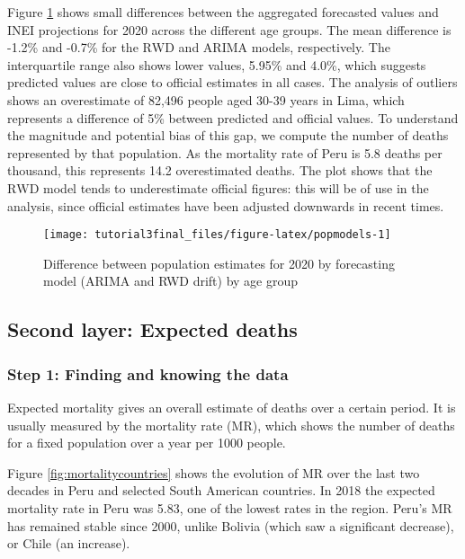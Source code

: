 \documentclass[
]{article}
\begin{document}
Figure \ref{fig:popmodels} shows small differences between the aggregated forecasted values and INEI projections for 2020 across the different age groups. The mean difference is -1.2\% and -0.7\% for the \(\text{RWD}\) and \(\text{ARIMA}\) models, respectively. The interquartile range also shows lower values, 5.95\% and 4.0\%, which suggests predicted values are close to official estimates in all cases. The analysis of outliers shows an overestimate of 82,496 people aged 30-39 years in Lima, which represents a difference of 5\% between predicted and official values. To understand the magnitude and potential bias of this gap, we compute the number of deaths represented by that population. As the mortality rate of Peru is 5.8 deaths per thousand, this represents 14.2 overestimated deaths. The plot shows that the \(\text{RWD}\) model tends to underestimate official figures: this will be of use in the analysis, since official estimates have been adjusted downwards in recent times.

\begin{figure}[H]

{\centering \texttt{[image: tutorial3final\_files/figure-latex/popmodels-1]} 

}

\caption{Difference between population estimates for 2020 by forecasting model (ARIMA and RWD drift) by age group}\label{fig:popmodels}
\end{figure}

\hypertarget{second-layer-expected-deaths}{%
\subsection{Second layer: Expected deaths}\label{second-layer-expected-deaths}}

\hypertarget{step-1-finding-and-knowing-the-data-1}{%
\subsubsection{Step 1: Finding and knowing the data}\label{step-1-finding-and-knowing-the-data-1}}

Expected mortality gives an overall estimate of deaths over a certain period. It is usually measured by the mortality rate (MR), which shows the number of deaths for a fixed population over a year per 1000 people.

Figure \ref{fig:mortalitycountries} shows the evolution of MR over the last two decades in Peru and selected South American countries. In 2018 the expected mortality rate in Peru was 5.83, one of the lowest rates in the region. Peru's MR has remained stable since 2000, unlike Bolivia (which saw a significant decrease), or Chile (an increase).
\end{document}
